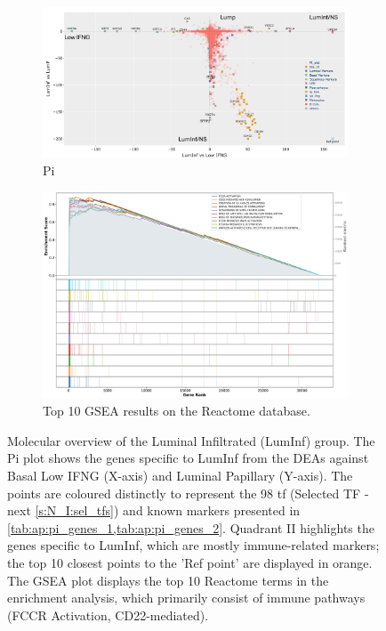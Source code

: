 \begin{figure}[H]
    \centering
    \captionsetup{font=small} 
    \begin{subfigure}[!t]{1.0\textwidth}
        \includegraphics[width=\textwidth,keepaspectratio]{Sections/ClusteringAnalysis/Resources/discussion/other_groups/lumInf_pi.png}
        \caption{Pi}
        \label{fig:cs:lumInf_pi}
    \end{subfigure}
    \centering
    \begin{subfigure}[!t]{0.9\textwidth}
        \includegraphics[width=\textwidth, keepaspectratio]{Sections/ClusteringAnalysis/Resources/discussion/other_groups/lumInf_reactome_10_top.png}
        \caption{Top 10 GSEA results on the Reactome database.}
        \label{fig:cs:lumInf_gsea}
    \end{subfigure} 
    \centering
    \caption{Molecular overview of the Luminal Infiltrated (LumInf) group. The Pi plot shows the genes specific to LumInf from the DEAs against Basal Low IFNG (X-axis) and Luminal Papillary (Y-axis). The points are coloured distinctly to represent the 98 \acrlong{tf} (Selected TF - next \cref{s:N_I:sel_tfs}) and known markers presented in \cref{tab:ap:pi_genes_1,tab:ap:pi_genes_2}. Quadrant II highlights the genes specific to LumInf, which are mostly immune-related markers; the top 10 closest points to the 'Ref point' are displayed in orange. The GSEA plot displays the top 10 Reactome terms in the enrichment analysis, which primarily consist of immune pathways (FCCR Activation, CD22-mediated).}
    \label{fig:cs:lumInf}
\end{figure}


